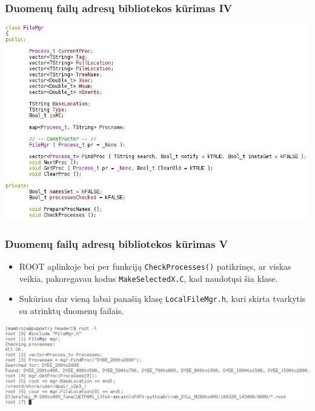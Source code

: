 \documentclass{beamer}
\begin{document}
\begin{frame}
\frametitle{Duomenų failų adresų bibliotekos kūrimas IV}

\begin{center}
	\includegraphics[width=0.99\textwidth]{filemgr.JPG}
\end{center}

\end{frame}


\begin{frame}
\frametitle{Duomenų failų adresų bibliotekos kūrimas V}

\begin{itemize}
	\item ROOT aplinkoje bei per funkciją \texttt{CheckProcesses()} patikrinęs, ar viskas veikia, pakoregavau kodus \texttt{MakeSelectedX.C}, kad naudotųsi šia klase.
	\item Sukūriau dar vieną labai panašią klasę \texttt{LocalFileMgr.h}, kuri skirta tvarkytis su atrinktų duomenų failais.
\end{itemize}

\begin{center}
	\includegraphics[width=1.02\textwidth]{MgrAtWork.JPG}
\end{center}

\end{frame}
\end{document}
